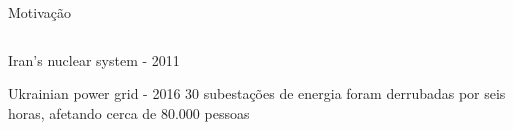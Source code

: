 \documentclass{uspBeamer}
\begin{document}
\begin{frame}{Motivação}
\begin{columns}
\begin{column}{.5\textwidth}
{\begin{block}{Iran's nuclear system - 2011}
                    \end{block}
                    \begin{block}{Ukrainian power grid - 2016}
                        30 subestações de energia foram derrubadas por seis horas, afetando cerca de 80.000 pessoas
                    \end{block}
                }
            \end{column}
        \end{columns}
    \end{frame}
\end{document}
